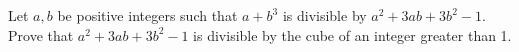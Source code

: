 Let $a,b$ be positive integers such that $a+b^3$ is divisible by $a^2+3ab+3b^2-1$. Prove that $a^2+3ab+3b^2-1$ is divisible by the cube of an integer greater than 1.